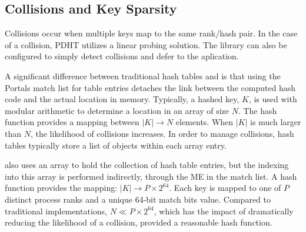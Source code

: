 \subsection{Collisions and Key Sparsity}

Collisions occur when multiple keys map to the same rank/hash pair.
In the case of a collision, PDHT utilizes a linear probing
solution. The library can also be configured to simply detect
collisions and defer to the aplication.


A significant difference between traditional hash tables and \pdht is
that using the Portals match list for table entries detaches the link
between the computed hash code and the actual location in
memory. Typically, a hashed key, $K$,  is used with modular arithmetic to
determine a location in an array of size $N$. The hash function
provides a mapping between $|K| \rightarrow N$ elements. When $|K|$ is
much larger than $N$, the likelihood of collisions increases. In order
to manage collisions, hash tables typically store a list of objects within
each array entry.
% 
%
%

\pdht also uses an array to hold the collection of hash table
entries, but the indexing into this array is performed indirectly,
through the ME in the match list. A \pdht hash function provides the 
mapping: $|K| \rightarrow P \times 2^{64}$. Each key is mapped to one
of $P$ distinct process ranks and a unique 64-bit match bits
value. Compared to traditional implementations, $N \ll  P \times
2^{64}$, which has the impact of dramatically reducing the likelihood
of a collision, provided a reasonable hash function.


